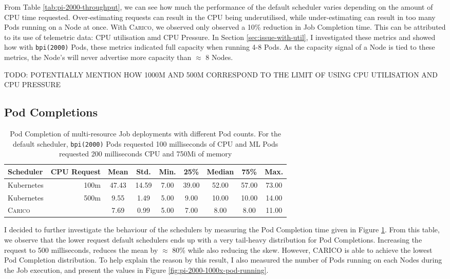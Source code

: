 From Table \ref{tab:pi-2000-throughput}, we can see how much the performance of
the default scheduler varies depending on the amount of CPU time requested.
Over-estimating requests can result in the CPU being underutilised, while
under-estimating can result in too many Pods running on a Node at once. With
\textsc{Carico}, we observed only observed a 10\% reduction in Job Completion time. This
can be attributed to its use of telemetric data: CPU utilisation amd CPU
Pressure. In Section \ref{sec:issue-with-util}, I investigated these metrics and
showed how with \texttt{bpi(2000)} Pods, these metrics indicated full capacity
when running 4-8 Pods. As the capacity signal of a Node is tied to these
metrics, the Node's will never advertise more capacity than $\approx$ 8 Nodes.

TODO: POTENTIALLY MENTION HOW 1000M AND 500M CORRESPOND TO THE LIMIT OF USING
CPU UTILISATION AND CPU PRESSURE

\subsection{Pod Completions}
\begin{table}[H]
\centering
    \begin{tabular}{|l|r|c|c|c|c|c|c|c|}
    \hline
        \bfseries Scheduler & \bfseries CPU Request & \bfseries Mean & \bfseries Std. &
        \bfseries Min. & \bfseries 25\% & \bfseries Median & \bfseries 75\% & \bfseries Max. \\
    \hline
        Kubernetes & 100m & 47.43 & 14.59 & 7.00 & 39.00 & 52.00 & 57.00 & 73.00
        \\
        Kubernetes & 500m & 9.55 & 1.49 & 5.00 & 9.00 & 10.00 & 10.00 & 14.00
        \\
        \textsc{Carico} & & 7.69 & 0.99 & 5.00 & 7.00 & 8.00 & 8.00 & 11.00 \\
    \hline
    \end{tabular}
    \caption{Pod Completion of multi-resource Job deployments with different Pod
    counts. For the default scheduler, \texttt{bpi(2000)} Pods requested 100
    milliseconds of CPU and ML Pods requested 200 milliseconds CPU and 750Mi of
    memory}
    \label{tab:cpu-pod-completions}
\end{table}
I decided to further investigate the behaviour of the schedulers by measuring
the Pod Completion time given in Figure \ref{tab:cpu-pod-completions}. From this
table, we observe that the lower request default schedulers ends up with a very
tail-heavy distribution for Pod Completions. Increasing the request to 500
milliseconds, reduces the mean by $\approx$ 80\% while also reducing the skew.
However, CARICO is able to achieve the lowest Pod Completion distribution. To
help explain the reason by this result, I also measured the number of Pods
running on each Nodes during the Job execution, and present the values in Figure
\ref{fig:pi-2000-1000x-pod-running}.

